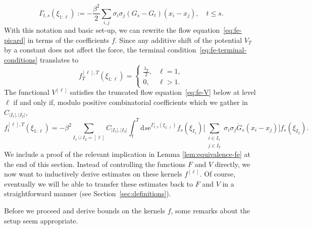 \documentclass[11pt, a4paper]{scrartcl}
\numberwithin{equation}{section}
\theoremstyle{plain}
\theoremstyle{remark}
\newcommand{\assign}{:=}
\newcommand{\mathd}{\mathrm{d}}
\newcommand{\mathe}{\mathrm{e}}
\begin{document}
\begin{equation}
	\Gamma_{t, s} (\xi_{1 : \ell}) \assign - \frac{\beta^2}{2}  \sum_{i, j} \sigma_i
	\sigma_j (G_s - G_t) (x_i - x_j), \quad t \leqslant s. \label{eq:def-W}
\end{equation}
With this notation and basic set-up, we can rewrite the flow
equation~\eqref{eq:fe-picard} in terms of the coefficients $f$. Since any
additive shift of the potential $V_T$ by a constant does not affect the force,
the terminal condition~\eqref{eq:fe-terminal-conditions} translates to
\begin{equation}
	f_T^{[\ell], T} (\xi_{1 : \ell}) = \begin{cases}
		\frac{\lambda_T}{2}, & \ell = 1, \\
		0,                   & \ell > 1.
	\end{cases} \label{eq:ic-fe}
\end{equation}
The functional $V^{[\ell]}$ satisfies
the truncated flow equation~\eqref{eq:fe-V} below at level $\ell$ if and only
if, modulo positive combinatorial coefficients which we gather in $C_{ | I_1 |,
			| I_2 |}$,
\begin{equation}
	f_t^{[\ell], T} (\xi_{1 : \ell}) = - \beta^2 \sum_{I_1 \dot{\cup} I_2 = [\ell]} C_{ | I_1 |,
			| I_2 |} \int_t^T \mathd s \mathe^{\Gamma_{t, s} (\xi_{1 : \ell})} f_s
	(\xi_{I_1}) \Big[ \sum_{\substack{{i \in I_1}\\{j \in I_2}}} \sigma_i \sigma_j
	\dot{G}_s (x_i - x_j) \Big] f_s  (\xi_{I_2}) . \label{eq:fe-v-coeffients}
\end{equation}
We include a proof of the relevant implication in Lemma
\ref{lem:equivalence-fe} at the end of this section.
Instead of controlling the functions $F$ and $V$ directly, we now want to
inductively derive estimates on these kernels $f^{[\ell]}$. Of course,
eventually we will be able to transfer these estimates back to $F$ and $V$ in
a straightforward manner (see Section~\ref{sec:definitions}).

Before we proceed and derive bounds on the kernels $f$, some remarks about the
setup seem appropriate.
\end{document}

